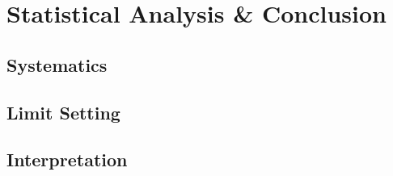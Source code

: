 \chapter{Statistical Analysis \& Conclusion}

\section{Systematics }

\section{Limit Setting }

\section{Interpretation }
